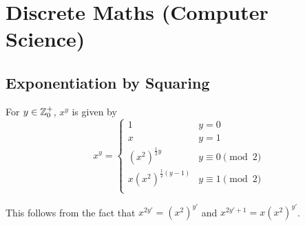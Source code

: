 \section{Discrete Maths (Computer Science)}

\subsection{Exponentiation by Squaring} \label{sec_exp_by_squaring}


For \(y \in \mathbb Z_0^+\), \(x^y\) is given by
\begin{equation}
x^y =
    \begin{cases}
    1 & y = 0 \\
    x & y = 1 \\
    (x ^ 2)^{\frac 12 y} & y \equiv 0 \pmod 2\\
    x(x ^ 2)^{\frac 12 (y-1)} & y \equiv 1 \pmod 2\\
    \end{cases}
\end{equation}

This follows from the fact that
\(x^{2y'} = (x^2)^{y'}\) and \(x^{2y' + 1} = x(x^2)^{y'}\).
